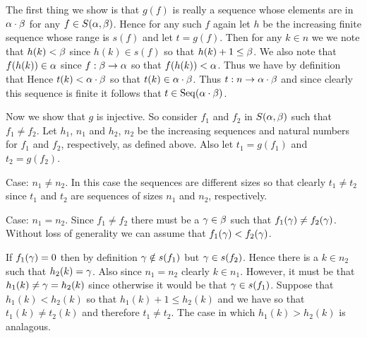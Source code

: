 \begin{solution}
  The first thing we show is that $g(f)$ is really a sequence whose elements are in $\alpha \cdot \beta$ for any $f \in S(\alpha, \beta)$.
  Hence for any such $f$ again let $h$ be the increasing finite sequence whose range is $s(f)$ and let $t = g(f)$.
  Then for any $k \in n$ we we note that $h(k) < \beta$ since $h(k) \in s(f)$ so that $h(k) + 1 \leq \beta$.
  We also note that $f(h(k)) \in \alpha$ since $f: \beta \to \alpha$ so that $f(h(k)) < \alpha$.
  Thus we have by definition that
  Hence $t(k) < \alpha \cdot \beta$ so that $t(k) \in \alpha \cdot \beta$.
  Thus $t: n \to \alpha \cdot \beta$ and since clearly this sequence is finite it follows that $t \in \mathrm{Seq}(\alpha \cdot \beta)$.

  Now we show that $g$ is injective.
  So consider $f_1$ and $f_2$ in $S(\alpha, \beta)$ such that $f_1 \neq f_2$.
  Let $h_1$, $n_1$ and $h_2$, $n_2$ be the increasing sequences and natural numbers for $f_1$ and $f_2$, respectively, as defined above.
  Also let $t_1 = g(f_1)$ and $t_2 = g(f_2)$.

  Case: $n_1 \neq n_2$.
  In this case the sequences are different sizes so that clearly $t_1 \neq t_2$ since $t_1$ and $t_2$ are sequences of sizes $n_1$ and $n_2$, respectively.

  Case: $n_1 = n_2$.
  Since $f_1 \neq f_2$ there must be a $\gamma \in \beta$ such that $f_1(\gamma) \neq f_2(\gamma)$.
  Without loss of generality we can assume that $f_1(\gamma) < f_2(\gamma)$.

  If $f_1(\gamma) = 0$ then by definition $\gamma \notin s(f_1)$ but $\gamma \in s(f_2)$.
  Hence there is a $k \in n_2$ such that $h_2(k) = \gamma$.
  Also since $n_1 = n_2$ clearly $k \in n_1$.
  However, it must be that $h_1(k) \neq \gamma = h_2(k)$ since otherwise it would be that $\gamma \in s(f_1)$.
  Suppose that $h_1(k) < h_2(k)$ so that $h_1(k) + 1 \leq h_2(k)$ and we have
  so that $t_1(k) \neq t_2(k)$ and therefore $t_1 \neq t_2$.
  The case in which $h_1(k) > h_2(k)$ is analagous.


\end{solution}
